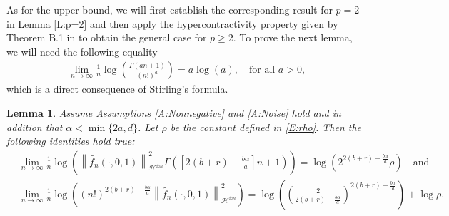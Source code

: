 \documentclass[a4paper,11pt]{article}
\numberwithin{equation}{section}
\numberwithin{equation}{section}
\theoremstyle{plain}
\newtheorem{lemma}[theorem]{Lemma}
\theoremstyle{definition}
\newcommand{\Norm}[1]{\left\|  #1   \right\|}
\begin{document}
As for the upper bound, we will first establish the corresponding result for $p=2$ in Lemma
\ref{L:p=2} and then apply the hypercontractivity property given by Theorem B.1 in \cite{BCC21} to
obtain the general case for $p\ge 2$. To prove the next lemma, we will need the following equality
  \begin{align} \label{E:Stirling}
    \lim_{n \to \infty} \frac{1}{n}\log\left( \frac{\Gamma(an+1)}{(n!)^a} \right) = a \log(a), \quad
    \text{for all $a>0$,}
\end{align}
which is a direct consequence of Stirling's formula.

\begin{lemma} \label{L:2ineq}
  Assume Assumptions \ref{A:Nonnegative} and \ref{A:Noise} hold and in addition that $\alpha <
  \min\{2a,d\}$. Let $\rho$ be the constant defined in \eqref{E:rho}. Then the following identities
  hold true:\\
  \begin{align} \label{E:2ineq-a}
    &\lim_{n \to \infty}  \frac{1}{n} \log \left( \Norm{ \widetilde{f_n}(\cdot,0,1) }_{ \mathcal{H}^{\otimes n} }^2 \Gamma\left( \left[ 2(b+r)- \frac{b \alpha}{a} \right] n +1 \right) \right)
    = \log\left(2^{2(b+r)-\frac{b\alpha}{a}}\rho\right) \quad \text{and}\\
    \label{E:2ineq-b}
    & \lim_{n \to \infty}  \frac{1}{n} \log \left( (n!)^{2(b+r)- \frac{b \alpha}{a} }\Norm{ \widetilde{f_n}(\cdot,0,1) }_{ \mathcal{H}^{\otimes n} }^2  \right)
    =  \log\left( \left(\frac{2}{2(b+r)-\frac{b\alpha}{a}}\right)^{2(b+r)-\frac{b\alpha}{a}}\right) + \log\rho.
  \end{align}
\end{lemma}
\end{document}
